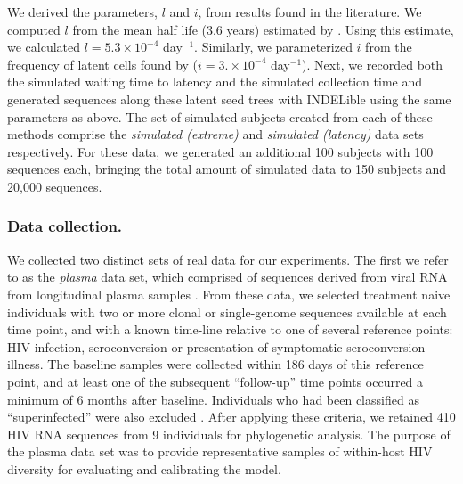 \documentclass[12pt]{article}
\begin{document}
We derived the parameters, $l$ and $i$, from results found in the literature.
We computed $l$ from the mean half life ($3.6$ years) estimated by \cite{Crooks15}.
Using this estimate, we calculated $l = 5.3 \times 10^{-4}$ day$^{-1}$.
Similarly, we parameterized $i$ from the frequency of latent cells found by \cite{Ho13} ($i = 3. \times 10^{-4}$ day$^{-1}$).
Next, we recorded both the simulated waiting time to latency and the simulated collection time and generated sequences along these latent seed trees with INDELible using the same parameters as above.
The set of simulated subjects created from each of these methods comprise the \emph{simulated (extreme)} and \emph{simulated (latency)} data sets respectively.
For these data, we generated an additional 100 subjects with 100 sequences each, bringing the total amount of simulated data to 150 subjects and 20,000 sequences.


\subsubsection * {Data collection.} \label{subsec:dcollection} %
We collected two distinct sets of real data for our experiments. 
The first we refer to as the {\em plasma} data set, which comprised of sequences derived from viral RNA from longitudinal plasma samples \citep{McCloskey14}. 
From these data, we selected treatment naive individuals with two or more clonal or single-genome sequences available at each time point, and with a known time-line relative to one of several reference points: HIV infection, seroconversion or presentation of symptomatic seroconversion illness. 
The baseline samples were collected within 186 days of this reference point, and at least one of the subsequent ``follow-up'' time points occurred a minimum of 6 months after baseline.
Individuals who had been classified as ``superinfected'' were also excluded \citep{McCloskey14}.
After applying these criteria, we retained 410 HIV RNA sequences from 9 individuals for phylogenetic analysis.
The purpose of the plasma data set was to provide representative samples of within-host HIV diversity for evaluating and calibrating the model.
\end{document}
